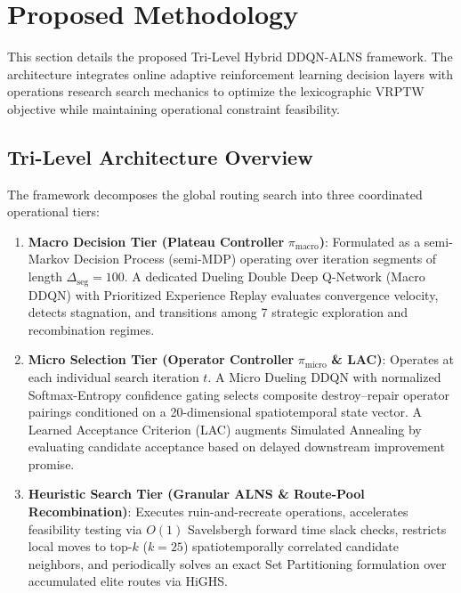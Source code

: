 \section{Proposed Methodology}
\label{sec:methodology}

This section details the proposed Tri-Level Hybrid DDQN-ALNS framework. The architecture integrates online adaptive reinforcement learning decision layers with operations research search mechanics to optimize the lexicographic VRPTW objective while maintaining operational constraint feasibility.

\subsection{Tri-Level Architecture Overview}
\label{sec:arch_overview}

The framework decomposes the global routing search into three coordinated operational tiers:
\begin{enumerate}
    \item \textbf{Macro Decision Tier (Plateau Controller} $\pi_{\text{macro}}$\textbf{)}: Formulated as a semi-Markov Decision Process (semi-MDP) operating over iteration segments of length $\Delta_{\text{seg}} = 100$. A dedicated Dueling Double Deep Q-Network (Macro DDQN) with Prioritized Experience Replay evaluates convergence velocity, detects stagnation, and transitions among 7 strategic exploration and recombination regimes.
    \item \textbf{Micro Selection Tier (Operator Controller} $\pi_{\text{micro}}$ \textbf{\& LAC)}: Operates at each individual search iteration $t$. A Micro Dueling DDQN with normalized Softmax-Entropy confidence gating selects composite destroy--repair operator pairings conditioned on a 20-dimensional spatiotemporal state vector. A Learned Acceptance Criterion (LAC) augments Simulated Annealing by evaluating candidate acceptance based on delayed downstream improvement promise.
    \item \textbf{Heuristic Search Tier (Granular ALNS \& Route-Pool Recombination)}: Executes ruin-and-recreate operations, accelerates feasibility testing via $O(1)$ Savelsbergh forward time slack checks, restricts local moves to top-$k$ ($k=25$) spatiotemporally correlated candidate neighbors, and periodically solves an exact Set Partitioning formulation over accumulated elite routes via HiGHS.
\end{enumerate}

